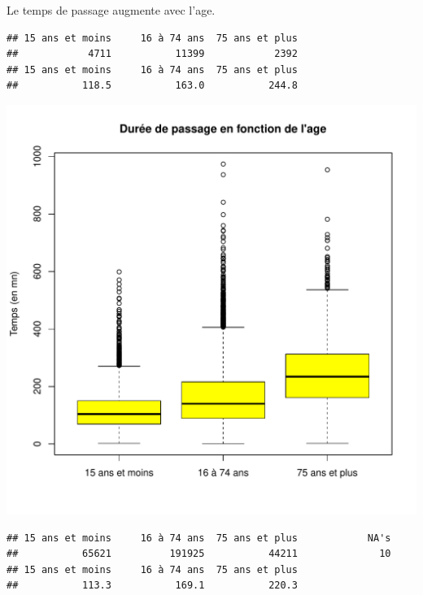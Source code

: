 \documentclass[12pt,english,french,twoside]{report}\usepackage[]{graphicx}\usepackage[]{color}
\makeatletter
\def\maxwidth{ %
  \ifdim\Gin@nat@width>\linewidth
    \linewidth
  \else
    \Gin@nat@width
  \fi
}
\newenvironment{kframe}{%
 \def\at@end@of@kframe{}%
 \ifinner\ifhmode%
  \def\at@end@of@kframe{\end{minipage}}%
  \begin{minipage}{\columnwidth}%
 \fi\fi%
 \def\FrameCommand##1{\hskip\@totalleftmargin \hskip-\fboxsep
 \colorbox{shadecolor}{##1}\hskip-\fboxsep
     \hskip-\linewidth \hskip-\@totalleftmargin \hskip\columnwidth}%
 \MakeFramed {\advance\hsize-\width
   \@totalleftmargin\z@ \linewidth\hsize
   \@setminipage}}%
 {\par\unskip\endMakeFramed%
 \at@end@of@kframe}
\newenvironment{knitrout}{}{} %
\makeatother
\begin{document}
Le temps de passage augmente avec l'age.
\begin{knitrout}
\color{fgcolor}\begin{kframe}
\begin{verbatim}
## 15 ans et moins     16 à 74 ans  75 ans et plus 
##            4711           11399            2392
## 15 ans et moins     16 à 74 ans  75 ans et plus 
##           118.5           163.0           244.8
\end{verbatim}
\end{kframe}
\includegraphics[width=\maxwidth]{figure/duree_age1} 
\begin{kframe}\begin{verbatim}
## 15 ans et moins     16 à 74 ans  75 ans et plus            NA's 
##           65621          191925           44211              10
## 15 ans et moins     16 à 74 ans  75 ans et plus 
##           113.3           169.1           220.3
\end{verbatim}
\end{kframe}

\end{knitrout}
\end{document}
